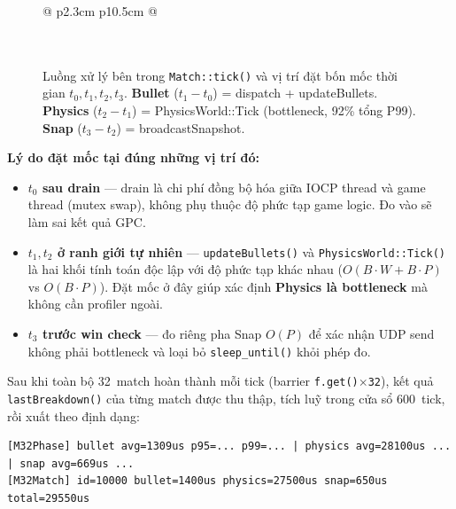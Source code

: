 \documentclass[12pt,a4paper]{report}
\begin{document}
\begin{figure}[H]
\begin{tabular}{@{} p{2.3cm} p{10.5cm} @{}}
 \\[-4pt]
 \\[3pt]

 \\

\end{tabular}
\caption{Luồng xử lý bên trong \texttt{Match::tick()} và vị trí đặt bốn mốc thời gian
         $t_0, t_1, t_2, t_3$.
         \textbf{Bullet} ($t_1-t_0$) = dispatch + updateBullets.
         \textbf{Physics} ($t_2-t_1$) = PhysicsWorld::Tick (bottleneck, 92\% tổng P99).
         \textbf{Snap} ($t_3-t_2$) = broadcastSnapshot.}
\label{fig:tick_pipeline_32}
\end{figure}

\noindent\textbf{Lý do đặt mốc tại đúng những vị trí đó:}

\begin{itemize}
  \item \textbf{$t_0$ sau drain} --- drain là chi phí đồng bộ hóa giữa IOCP thread
        và game thread (mutex swap), không phụ thuộc độ phức tạp game logic.
        Đo vào sẽ làm sai kết quả GPC.

  \item \textbf{$t_1, t_2$ ở ranh giới tự nhiên} --- \texttt{updateBullets()} và
        \texttt{PhysicsWorld::Tick()} là hai khối tính toán độc lập với độ phức
        tạp khác nhau ($O(B{\cdot}W{+}B{\cdot}P)$ vs $O(B{\cdot}P)$).
        Đặt mốc ở đây giúp xác định \textbf{Physics là bottleneck} mà không cần
        profiler ngoài.

  \item \textbf{$t_3$ trước win check} --- đo riêng pha Snap $O(P)$ để xác nhận
        UDP send không phải bottleneck và loại bỏ \texttt{sleep\_until()} khỏi
        phép đo.
\end{itemize}

Sau khi toàn bộ 32~match hoàn thành mỗi tick (barrier \texttt{f.get()$\times$32}),
kết quả \texttt{lastBreakdown()} của từng match được thu thập, tích luỹ trong
cửa sổ 600~tick, rồi xuất theo định dạng:

\begin{lstlisting}[style=cppStyle,
  caption={Log line định kỳ của bench\_32match sau mỗi 600 tick},
  label={lst:m32log}]
[M32Phase] bullet avg=1309us p95=... p99=... | physics avg=28100us ... | snap avg=669us ...
[M32Match] id=10000 bullet=1400us physics=27500us snap=650us total=29550us
\end{lstlisting}
\end{document}
